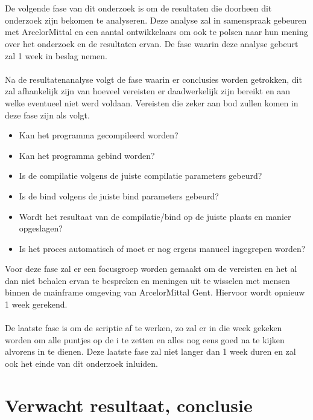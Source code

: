 \\ \\
De volgende fase van dit onderzoek is om de resultaten die doorheen dit onderzoek zijn bekomen te analyseren.
Deze analyse zal in samenspraak gebeuren met ArcelorMittal en een aantal ontwikkelaars om ook te polsen naar hun mening over het onderzoek en de resultaten ervan.
De fase waarin deze analyse gebeurt zal 1 week in beslag nemen.
\\ \\
Na de resultatenanalyse volgt de fase waarin er conclusies worden getrokken, dit zal afhankelijk zijn van hoeveel vereisten er daadwerkelijk zijn bereikt en aan welke eventueel niet werd voldaan. Vereisten die zeker aan bod zullen komen in deze fase zijn als volgt.
\begin{itemize}
    \item Kan het programma gecompileerd worden?
    \item Kan het programma gebind worden?
    \item Is de compilatie volgens de juiste compilatie parameters gebeurd?
    \item Is de bind volgens de juiste bind parameters gebeurd?
    \item Wordt het resultaat van de compilatie/bind op de juiste plaats en manier opgeslagen?
    \item Is het proces automatisch of moet er nog ergens manueel ingegrepen worden?
\end{itemize}
Voor deze fase zal er een focusgroep worden gemaakt om de vereisten en het al dan niet behalen ervan te bespreken en meningen uit te wisselen met mensen binnen de mainframe omgeving van ArcelorMittal Gent. Hiervoor wordt opnieuw 1 week gerekend.
\\ \\
De laatste fase is om de scriptie af te werken, zo zal er in die week gekeken worden om alle puntjes op de i te zetten en alles nog eens goed na te kijken alvorens in te dienen.
Deze laatste fase zal niet langer dan 1 week duren en zal ook het einde van dit onderzoek inluiden.



\section{Verwacht resultaat, conclusie}%
\label{sec:verwachte_resultaten}

